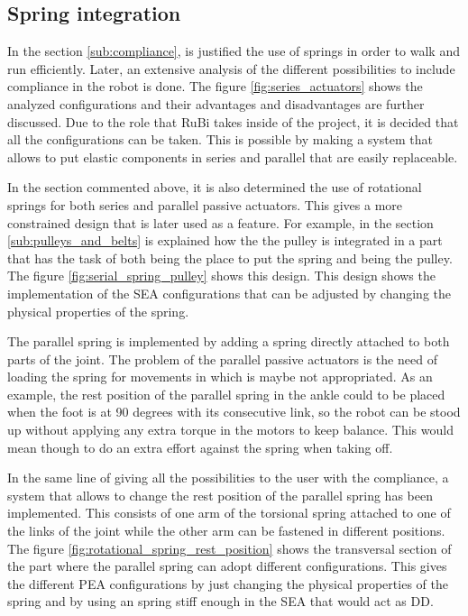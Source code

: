 \subsection{Spring integration} %
\label{sub:spring_integration}
In the section \ref{sub:compliance}, is justified the use of springs in order to walk and run efficiently. 
Later, an extensive analysis of the different possibilities to include compliance in the robot is done.
The figure \ref{fig:series_actuators} shows the analyzed configurations and their advantages and disadvantages are further discussed.
Due to the role that RuBi takes inside of the project, it is decided that all the configurations can be taken.
This is possible by making a system that allows to put elastic components in series and parallel that are easily replaceable.

In the section commented above, it is also determined the use of rotational springs for both series and parallel passive actuators.
This gives a more constrained design that is later used as a feature.
For example, in the section \ref{sub:pulleys_and_belts} is explained how the the pulley is integrated in a part that has the task of both being the place to put the spring and being the pulley.
The figure \ref{fig:serial_spring_pulley} shows this design.
This design shows the implementation of the SEA configurations that can be adjusted by changing the physical properties of the spring.

The parallel spring is implemented by adding a spring directly attached to both parts of the joint.
The problem of the parallel passive actuators is the need of loading the spring for movements in which is maybe not appropriated.
As an example, the rest position of the parallel spring in the ankle could to be placed when the foot is at 90 degrees with its consecutive link, so the robot can be stood up without applying any extra torque in the motors to keep balance.
This would mean though to do an extra effort against the spring when taking off.

In the same line of giving all the possibilities to the user with the compliance, a system that allows to change the rest position of the parallel spring has been implemented.
This consists of one arm of the torsional spring attached to one of the links of the joint while the other arm can be fastened in different positions.
The figure \ref{fig:rotational_spring_rest_position} shows the transversal section of the part where the parallel spring can adopt different configurations. 
This gives the different PEA configurations by just changing the physical properties of the spring and by using an spring stiff enough in the SEA that would act as DD.

